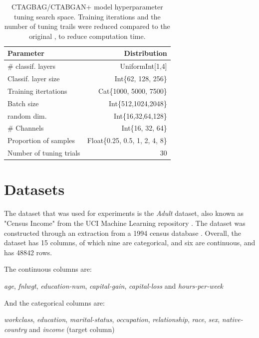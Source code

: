 \begin{table}[h]
	\centering
	\begin{tabular}{lr}
		\toprule
		Parameter               & Distribution                   \\
		\midrule
		\# classif. layers      & UniformInt[1,4]                \\
		Classif. layer size     & Int\{62, 128, 256\}            \\
		Training itertations    & Cat\{1000, 5000, 7500\}        \\
		Batch size              & Int\{512,1024,2048\}           \\
		random dim.             & Int\{16,32,64,128\}            \\
		\# Channels             & Int\{16, 32, 64\}              \\
		Proportion of samples   & Float\{0.25, 0.5, 1, 2, 4, 8\} \\
		\midrule
		Number of tuning trials & 30                             \\
		\bottomrule
	\end{tabular}
	\caption{CTAGBAG/CTABGAN+ model hyperparameter tuning search space. Training iterations and the number of tuning trails were reduced compared to the original \cite{kotelnikov2022TabDDPMModellingTabular}, to reduce computation time.}
	\label{tab:ctabgan_tune}
\end{table}

\section{Datasets}
\label{ch:methods-datasets}

The dataset that was used for experiments is the \textit{Adult} dataset, also known as "Census Income" from the UCI Machine Learning repository \cite{Dua:2019}.
The dataset was constructed through an extraction from a 1994 census database \cite{kohavi1996ScalingAccuracyNaiveBayes}.
Overall, the dataset has 15 columns, of which nine are categorical, and six are continuous, and has 48842 rows.

The continuous columns are:


\textit{age}, \textit{fnlwgt}, \textit{education-num}, \textit{capital-gain}, \textit{capital-loss} and \textit{hours-per-week}


And the categorical columns are:


\textit{workclass}, \textit{education}, \textit{marital-status}, \textit{occupation}, \textit{relationship}, \textit{race}, \textit{sex}, \textit{native-country} and \textit{income} (target column)



